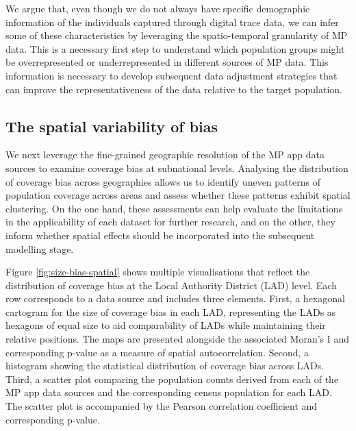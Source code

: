 \documentclass[]{rsos}%
\begin{document}
We argue that, even though we do not always have specific demographic
information of the individuals captured through digital trace data, we
can infer some of these characteristics by leveraging the
spatio-temporal granularity of MP data. This is a necessary first step
to understand which population groups might be overrepresented or
underrepresented in different sources of MP data. This information is
necessary to develop subsequent data adjustment strategies that can
improve the representativeness of the data relative to the target
population.

\subsection{The spatial variability of bias}\label{the-spatial-variability-of-bias}

We next leverage the fine-grained geographic resolution of the MP app
data sources to examine coverage bias at subnational levels. Analysing
the distribution of coverage bias across geographies allows us to
identify uneven patterns of population coverage across areas and assess
whether these patterns exhibit spatial clustering. On the one hand,
these assessments can help evaluate the limitations in the applicability
of each dataset for further research, and on the other, they inform
whether spatial effects should be incorporated into the subsequent
modelling stage.

Figure \ref{fig:size-bias-spatial} shows multiple visualisations that
reflect the distribution of coverage bias at the Local Authority
District (LAD) level. Each row corresponds to a data source and includes
three elements. First, a hexagonal cartogram for the size of coverage
bias in each LAD, representing the LADs as hexagons of equal size to aid
comparability of LADs while maintaining their relative positions. The
maps are presented alongside the associated Moran's I and corresponding
p-value as a measure of spatial autocorrelation. Second, a histogram
showing the statistical distribution of coverage bias across LADs.
Third, a scatter plot comparing the population counts derived from each
of the MP app data sources and the corresponding census population for
each LAD. The scatter plot is accompanied by the Pearson correlation
coefficient and corresponding p-value.
\end{document}

